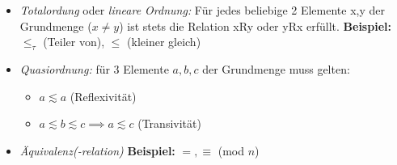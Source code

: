 \begin{itemize}
\item \emph{Totalordung} oder \emph{lineare Ordnung:} Für jedes
  beliebige 2 Elemente x,y der Grundmenge ($x \ne y$) ist stets die
  Relation xRy oder yRx erfüllt. \textbf{Beispiel:} $\le_\tau$ (Teiler
  von), $\le$ (kleiner gleich)
\item \emph{Quasiordnung:} für 3 Elemente $a,b,c$ der Grundmenge muss gelten:
  \begin{itemize}
  \item $a\lesssim a$ (Reflexivität)
  \item $a\lesssim b\lesssim c \implies a \lesssim c$ (Transivität)
  \end{itemize}
\item \emph{Äquivalenz(-relation)}  \textbf{Beispiel:} $=, \equiv$ (mod $n$)
\end{itemize}


